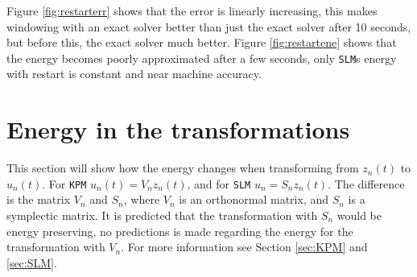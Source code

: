 \noindent Figure \ref{fig:restarterr} shows that the error is linearly increasing, this makes windowing with an exact solver better than just the exact solver after 10 seconds, but before this, the exact solver much better. Figure \ref{fig:restartene} shows that the energy becomes poorly approximated after a few seconds, only \texttt{SLM}s energy with restart is constant and near machine accuracy. %


\section{Energy in the transformations}%
\label{sec:transf}
This section will show how the energy changes when transforming from $z_n(t)$ to $u_n(t)$. For \texttt{KPM} $u_n(t) = V_n z_n(t)$, and for \texttt{SLM} $u_n = S_n z_n(t)$. The difference is the matrix $V_n$ and $S_n$, where $V_n$ is an orthonormal matrix, and $S_n$ is a symplectic matrix. It is predicted that the transformation with $S_n$ would be energy preserving, no predictions is made regarding the energy for the transformation with $V_n$. For more information see Section \ref{sec:KPM} and \ref{sec:SLM}. 

